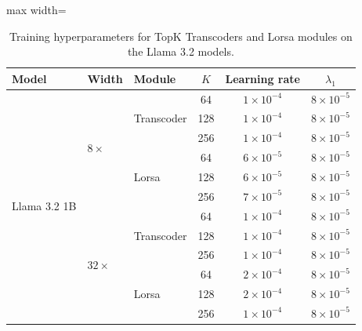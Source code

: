 \documentclass{article}
\begin{document}
\begin{table}[t]
    \centering
    \caption{
    Training hyperparameters for TopK Transcoders and Lorsa modules
    on the Llama 3.2 models.
    }
    \label{tab:topk_training_hyperparameters_llama}

    \captionsetup{skip=10pt}

    \footnotesize
    \renewcommand{\arraystretch}{1.0}
    \setlength{\tabcolsep}{8pt}

    \begin{adjustbox}{max width=\textwidth}
    \begin{tabular}{lllccc}
        \toprule
        Model
        & Width
        & Module
        & $K$
        & Learning rate
        & $\lambda_{1}$ \\
        \midrule

        \multirow{12}{*}{Llama 3.2 1B}
        & \multirow{6}{*}{$8\times$}
        & \multirow{3}{*}{Transcoder}
        & 64  & $1{\times}10^{-4}$ & $8{\times}10^{-5}$ \\
        & & & 128 & $1{\times}10^{-4}$ & $8{\times}10^{-5}$ \\
        & & & 256 & $1{\times}10^{-4}$ & $8{\times}10^{-5}$ \\
        \cmidrule(lr){3-6}
        & & \multirow{3}{*}{Lorsa}
        & 64  & $6{\times}10^{-5}$ & $8{\times}10^{-5}$ \\
        & & & 128 & $6{\times}10^{-5}$ & $8{\times}10^{-5}$ \\
        & & & 256 & $7{\times}10^{-5}$ & $8{\times}10^{-5}$ \\
        \cmidrule(lr){2-6}
        & \multirow{6}{*}{$32\times$}
        & \multirow{3}{*}{Transcoder}
        & 64  & $1{\times}10^{-4}$ & $8{\times}10^{-5}$ \\
        & & & 128 & $1{\times}10^{-4}$ & $8{\times}10^{-5}$ \\
        & & & 256 & $1{\times}10^{-4}$ & $8{\times}10^{-5}$ \\
        \cmidrule(lr){3-6}
        & & \multirow{3}{*}{Lorsa}
        & 64  & $2{\times}10^{-4}$ & $8{\times}10^{-5}$ \\
        & & & 128 & $2{\times}10^{-4}$ & $8{\times}10^{-5}$ \\
        & & & 256 & $1{\times}10^{-4}$ & $8{\times}10^{-5}$ \\

        \midrule


\end{tabular}
\end{adjustbox}
\end{table}
\end{document}
